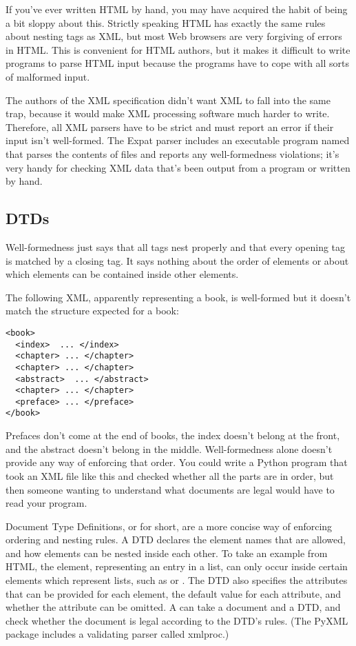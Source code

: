 \documentclass{howto}
\newcommand{\element}[1]{\code{#1}}
\begin{document}
If you've ever written HTML by hand, you may have acquired the habit
of being a bit sloppy about this.  Strictly speaking HTML has exactly
the same rules about nesting tags as XML, but most Web browsers are
very forgiving of errors in HTML.  This is convenient for HTML
authors, but it makes it difficult to write programs to parse HTML
input because the programs have to cope with all sorts of malformed
input.

The authors of the XML specification didn't want XML to fall into the
same trap, because it would make XML processing software much harder
to write.  Therefore, all XML parsers have to be strict and must
report an error if their input isn't well-formed.  The Expat parser
includes an executable program named  that parses the
contents of files and reports any well-formedness violations; it's
very handy for checking XML data that's been output from a program or
written by hand.


\subsection{DTDs}

Well-formedness just says that all tags nest properly and that every
opening tag is matched by a closing tag.  It says nothing about the
order of elements or about which elements can be contained inside other
elements.

The following XML, apparently representing a book, is well-formed but
it doesn't match the structure expected for a book:

\begin{verbatim}
<book>
  <index>  ... </index>
  <chapter> ... </chapter>
  <chapter> ... </chapter>
  <abstract>  ... </abstract>
  <chapter> ... </chapter>
  <preface> ... </preface>
</book>
\end{verbatim}

Prefaces don't come at the end of books, the index doesn't belong at
the front, and the abstract doesn't belong in the middle.
Well-formedness alone doesn't provide any way of enforcing that order.
You could write a Python program that took an XML file like this and
checked whether all the parts are in order, but then someone wanting
to understand what documents are legal would have to read your program.

Document Type Definitions, or  for short, are a more concise
way of enforcing ordering and nesting rules. A DTD declares the
element names that are allowed, and how elements can be nested inside
each other.  To take an example from HTML, the \element{LI} element,
representing an entry in a list, can only occur inside certain
elements which represent lists, such as \element{OL} or \element{UL}.
The DTD also specifies the attributes that can be provided for each
element, the default value for each attribute, and whether the
attribute can be omitted.  A  can take a
document and a DTD, and check whether the document is legal according
to the DTD's rules.  (The PyXML package includes a validating parser
called xmlproc.)
\end{document}
